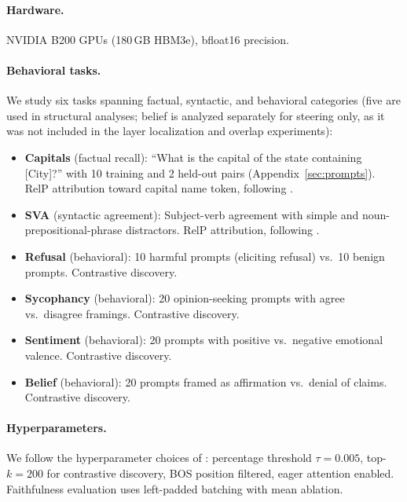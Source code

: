 \documentclass[11pt]{article}
\begin{document}
\paragraph{Hardware.}
NVIDIA B200 GPUs (180\,GB HBM3e), bfloat16 precision.

\paragraph{Behavioral tasks.}
We study six tasks spanning factual, syntactic, and behavioral categories (five are used in structural analyses; belief is analyzed separately for steering only, as it was not included in the layer localization and overlap experiments):

\begin{itemize}[leftmargin=2em]
    \item \textbf{Capitals} (factual recall): ``What is the capital of the state containing [City]?'' with 10 training and 2 held-out pairs (Appendix~\ref{sec:prompts}). RelP attribution toward capital name token, following \citet{arora2025circuits}.
    \item \textbf{SVA} (syntactic agreement): Subject-verb agreement with simple and noun-prepositional-phrase distractors. RelP attribution, following \citet{arora2025circuits}.
    \item \textbf{Refusal} (behavioral): 10 harmful prompts (eliciting refusal) vs.\ 10 benign prompts. Contrastive discovery.
    \item \textbf{Sycophancy} (behavioral): 20 opinion-seeking prompts with agree vs.\ disagree framings. Contrastive discovery.
    \item \textbf{Sentiment} (behavioral): 20 prompts with positive vs.\ negative emotional valence. Contrastive discovery.
    \item \textbf{Belief} (behavioral): 20 prompts framed as affirmation vs.\ denial of claims. Contrastive discovery.
\end{itemize}

\paragraph{Hyperparameters.}
We follow the hyperparameter choices of \citet{arora2025circuits}: percentage threshold $\tau{=}0.005$, top-$k = 200$ for contrastive discovery, BOS position filtered, eager attention enabled.
Faithfulness evaluation uses left-padded batching with mean ablation.


\end{document}
